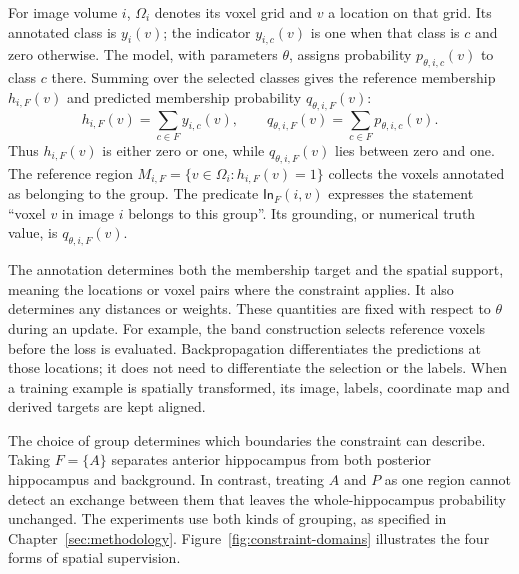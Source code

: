 \documentclass[12pt,a4paper]{article}
\begin{document}
For image volume $i$, $\Omega_i$ denotes its voxel grid and $v$ a location
on that grid. Its annotated class is $y_i(v)$; the indicator $y_{i,c}(v)$
is one when that class is $c$ and zero otherwise. The model, with parameters
$\theta$, assigns probability $p_{\theta,i,c}(v)$ to class $c$ there.
Summing over the selected classes gives the reference membership
$h_{i,F}(v)$ and predicted membership probability $q_{\theta,i,F}(v)$:
\begin{equation}
h_{i,F}(v)=\sum_{c\in F}y_{i,c}(v),
\qquad
q_{\theta,i,F}(v)=\sum_{c\in F}p_{\theta,i,c}(v).
\label{eq:constraint-group-membership}
\end{equation}
Thus $h_{i,F}(v)$ is either zero or one, while $q_{\theta,i,F}(v)$ lies
between zero and one. The reference region
$M_{i,F}=\{v\in\Omega_i:h_{i,F}(v)=1\}$ collects the voxels annotated
as belonging to the group. The predicate $\mathsf{In}_F(i,v)$ expresses
the statement ``voxel $v$ in image $i$ belongs to this group''. Its
grounding, or numerical truth value, is $q_{\theta,i,F}(v)$.

The annotation determines both the membership target and the spatial
support, meaning the locations or voxel pairs where the constraint applies.
It also determines any distances or weights.
These quantities are fixed with respect to $\theta$ during an update.
For example, the band construction selects reference voxels before the
loss is evaluated. Backpropagation differentiates the predictions at those
locations; it does not need to differentiate the selection or the labels.
When a training example is spatially transformed, its image, labels,
coordinate map and derived targets are kept aligned.

The choice of group determines which boundaries the constraint can
describe. Taking $F=\{A\}$ separates anterior hippocampus from both
posterior hippocampus and background. In contrast, treating $A$ and $P$
as one region cannot detect an exchange between them that leaves the
whole-hippocampus probability unchanged. The experiments use both kinds
of grouping, as specified in Chapter~\ref{sec:methodology}.
Figure~\ref{fig:constraint-domains} illustrates the four forms of
spatial supervision.
\end{document}
